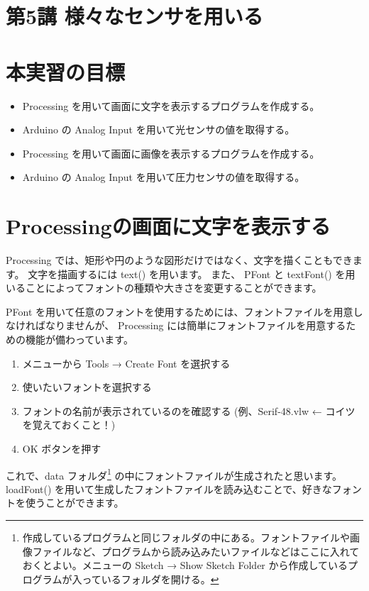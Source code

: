\documentclass[11pt,a4paper]{jarticle}
\begin{document}
\section*{\LARGE{第5講 様々なセンサを用いる}}
\section{本実習の目標}
\begin{itemize}
 \item Processing を用いて画面に文字を表示するプログラムを作成する。
 \item Arduino の Analog Input を用いて光センサの値を取得する。
 \item Processing を用いて画面に画像を表示するプログラムを作成する。
 \item Arduino の Analog Input を用いて圧力センサの値を取得する。
\end{itemize}



\section{Processingの画面に文字を表示する}
Processing では、矩形や円のような図形だけではなく、文字を描くこともできます。
文字を描画するには text() を用います。
また、 PFont と textFont() を用いることによってフォントの種類や大きさを変更することができます。

PFont を用いて任意のフォントを使用するためには、フォントファイルを用意しなければなりませんが、
Processing には簡単にフォントファイルを用意するための機能が備わっています。
\begin{enumerate}
 \item メニューから Tools → Create Font を選択する
 \item 使いたいフォントを選択する
 \item フォントの名前が表示されているのを確認する (例、Serif-48.vlw ← コイツを覚えておくこと！)
 \item OK ボタンを押す
\end{enumerate}
これで、data フォルダ\footnote{作成しているプログラムと同じフォルダの中にある。フォントファイルや画像ファイルなど、プログラムから読み込みたいファイルなどはここに入れておくとよい。メニューの Sketch → Show Sketch Folder から作成しているプログラムが入っているフォルダを開ける。}
の中にフォントファイルが生成されたと思います。
loadFont() を用いて生成したフォントファイルを読み込むことで、好きなフォントを使うことができます。
\end{document}
